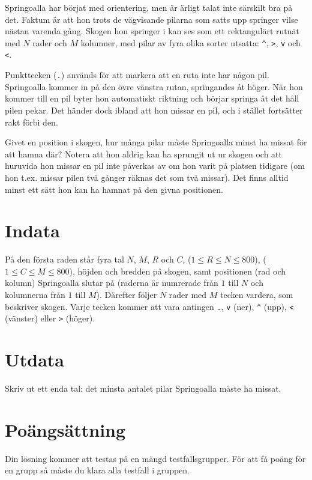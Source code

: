 Springoalla har börjat med orientering, men är ärligt talat inte
särskilt bra på det. Faktum är att hon trots de vägvisande pilarna
som satts upp springer vilse nästan varenda gång. Skogen hon springer
i kan ses som ett rektangulärt rutnät med $N$ rader och $M$ kolumner,
med pilar av fyra olika sorter utsatta: \verb+^+, \texttt{>},
\texttt{v} och \texttt{<}.

Punkttecken (\texttt{.}) används för att markera att en ruta inte har någon
pil. Springoalla
kommer in på den övre vänstra rutan, springandes åt höger. När hon
kommer till en pil byter hon automatiskt riktning och börjar springa
åt det håll pilen pekar. Det händer dock ibland att hon missar en
pil, och i stället fortsätter rakt förbi den.

Givet en position i skogen, hur många pilar måste Springoalla minst ha
missat för att hamna där? Notera att hon aldrig kan ha sprungit ut ur
skogen och att huruvida hon missar en pil inte påverkas av om hon varit
på platsen tidigare (om hon t.ex. missar pilen två gånger räknas det
som två missar). Det finns alltid minst ett sätt hon kan ha hamnat på den givna positionen.

\section*{Indata}

På den första raden står fyra tal $N$, $M$, $R$ och $C$, ($1 \leq R \leq N \leq 800$),
($1 \leq C \leq M \leq 800$), höjden och bredden på skogen, samt positionen (rad och kolumn) Springoalla slutar
på (raderna är numrerade från $1$ till $N$ och kolumnerna från $1$ till
$M$). Därefter följer $N$ rader med $M$ tecken vardera, som beskriver skogen.
Varje tecken kommer att vara antingen \texttt{.}, \texttt{v} (ner),
\verb+^+ (upp), \texttt{<} (vänster) eller \texttt{>} (höger).

\section*{Utdata}
Skriv ut ett enda tal: det minsta antalet pilar Springoalla måste ha missat.

\section*{Poängsättning}
Din lösning kommer att testas på en mängd testfallsgrupper.
För att få poäng för en grupp så måste du klara alla testfall i gruppen.


